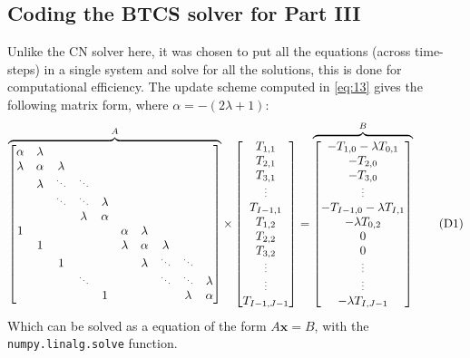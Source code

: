 \documentclass[a4paper]{article} %
\newcommand{\sddots}{\scalebox{0.75}{$\ddots$}}
\newcommand{\svdots}{\scalebox{0.75}{$\vdots$}}
\begin{document}
\begin{appendices}
\section{Coding the BTCS solver for Part III}
\label{appendix:code1}
Unlike the CN solver here, it was chosen to put all the equations (across time-steps) in a single system and solve for all the solutions, this is done for computational efficiency.
The update scheme computed in \eqref{eq:13} gives the following matrix form, where $\alpha= -(2\lambda + 1)$:
\begin{align*}
\overbrace{
\begin{bmatrix}
     \alpha & \lambda & & & & \\
     \lambda & \alpha & \lambda & & & \\ 
     & \lambda & \sddots & \sddots & & \\ 
     & & \sddots & \sddots & \lambda \\
     & & & \lambda & \alpha \\
     1 & & & & & \alpha & \lambda \\
     & 1 & & & & \lambda & \alpha & \lambda \\
     & & 1 & & & & \lambda & \sddots & \sddots \\
     & & & \sddots & & & & \sddots & \sddots & \lambda \\
     & & & & 1 & & & & \lambda & \alpha \\
\end{bmatrix}
}^{A}
\times
\begin{bmatrix}
     T_{1,1} \\
     T_{2,1} \\
     T_{3,1} \\
     \svdots \\
     T_{I-1,1} \\
     T_{1,2} \\
     T_{2,2} \\
     T_{3,2} \\
     \svdots \\
     \svdots \\
     T_{I-1,J-1}\\
\end{bmatrix}
= 
\overbrace{
\begin{bmatrix}
     -T_{1,0} - \lambda T_{0,1}\\
     -T_{2,0} \\
     -T_{3,0} \\
     \svdots \\
     -T_{I-1,0} - \lambda T_{I,1}\\
      -\lambda T_{0,2}\\
      0\\
      0\\
     \svdots \\
     \svdots \\
     -\lambda T_{I,J-1}\\ 
\end{bmatrix}
}^{B} \tag*{(D1)}
\end{align*}
Which can be solved as a equation of the form $A \bm{x} = B$, with the \verb|numpy.linalg.solve|\supercite{np} function. 


\end{appendices}
\end{document}
